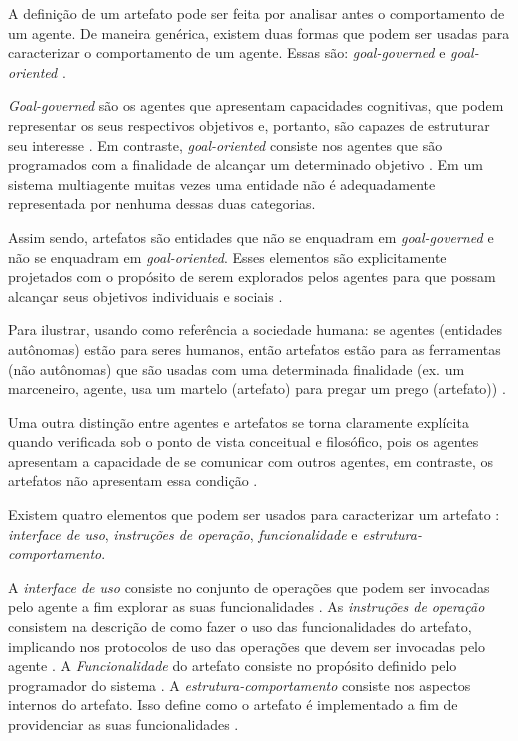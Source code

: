 A definição de um artefato pode ser feita por analisar antes o comportamento de um agente. De maneira genérica, existem duas formas que podem ser usadas para caracterizar o comportamento de um agente. Essas são: \textit{goal-governed} e \textit{goal-oriented} \cite{relationwithagentprogram} \cite{programingagentartefact}.

\textit{Goal-governed} são os agentes que apresentam capacidades cognitivas, que podem representar os seus respectivos objetivos e, portanto, são capazes de estruturar seu interesse \cite{relationwithagentprogram,programingagentartefact}. Em contraste, \textit{goal-oriented} consiste nos agentes que são programados com a finalidade de alcançar um determinado objetivo \cite{relationwithagentprogram,programingagentartefact}. Em um sistema multiagente muitas vezes
uma entidade não é adequadamente representada por nenhuma dessas duas categorias. 

Assim sendo, artefatos são entidades que não se enquadram em  \textit{goal-governed} e não se enquadram em \textit{goal-oriented}. Esses elementos são explicitamente projetados com o propósito de serem explorados pelos agentes para que possam alcançar seus objetivos individuais e sociais \cite{programingagentartefact,cartago}. 

Para ilustrar, usando como referência a sociedade humana: se agentes (entidades autônomas) estão para seres humanos, então artefatos estão para as ferramentas (não autônomas) que são usadas com uma determinada finalidade (ex. um marceneiro, agente, usa um martelo (artefato) para pregar um prego (artefato)) \cite{programingagentartefact}.

Uma outra distinção entre agentes e artefatos se torna claramente explícita quando verificada sob o ponto de vista conceitual e filosófico, pois os agentes apresentam a capacidade de se comunicar com outros agentes, em contraste, os artefatos não apresentam essa condição \cite{programingagentartefact}.

Existem quatro elementos que podem ser usados para caracterizar um artefato \cite{programingagentartefact}: \textit{interface de uso}, \textit{instruções de operação}, \textit{funcionalidade} e \textit{estrutura-comportamento}.

A \textit{interface de uso} consiste no conjunto de operações que podem ser invocadas pelo agente a fim explorar as suas funcionalidades \cite{programingagentartefact}. As \textit{instruções de operação} consistem na descrição de como fazer o uso das funcionalidades do artefato, implicando nos protocolos de uso das operações que devem ser invocadas pelo agente \cite{programingagentartefact}. A \textit{Funcionalidade} do artefato consiste no propósito definido pelo programador do sistema \cite{programingagentartefact}. A \textit{estrutura-comportamento} consiste nos aspectos internos do artefato. Isso define como o artefato é implementado a fim de providenciar as suas funcionalidades \cite{programingagentartefact}.    


